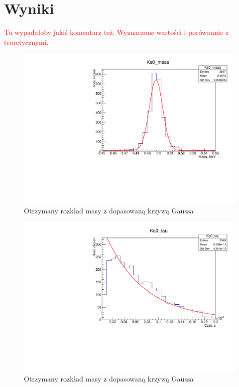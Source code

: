 \section{Wyniki}

\textcolor{red}{Tu wypadałoby jakiś komentarz też. Wyznaczone wartości i porównanie z teoretycznymi.}
\begin{figure}[h]
	\includegraphics[width=\textwidth]{ceiio/ks0mass}
	\caption{Otrzymany rozkład masy z dopasowaną krzywą Gaussa}
	\label{img:mass}
\end{figure}
\begin{figure}[h]
	\includegraphics[width=\textwidth]{ceiio/ks0tau}
	\caption{Otrzymany rozkład masy z dopasowaną krzywą Gaussa}
	\label{img:mass}
\end{figure}
